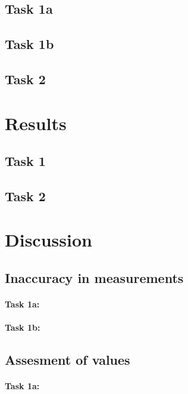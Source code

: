 \documentclass[onecolumn]{article}
\begin{document}
\subsection{Task 1a}


\subsection{Task 1b}


\subsection{Task 2}

\clearpage

\section{Results}
\subsection{Task 1}

\subsection{Task 2}

\textbf{}

\section{Discussion}

\subsection{Inaccuracy in measurements}
\paragraph{Task 1a:} 


\paragraph{Task 1b:} 

\subsection{Assesment of values}

\paragraph{Task 1a:} 
\end{document}
